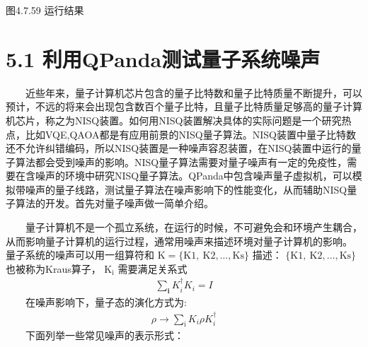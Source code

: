 \documentclass[a4paper,11pt,english]{sphinxmanual}
\begin{document}
\begin{center}图4.7.59 运行结果
\end{center}
\sphinxstepscope


\section{5.1 利用QPanda测试量子系统噪声}
\label{\detokenize{rst/5.1_u5229_u7528QPanda_u6d4b_u8bd5_u91cf_u5b50_u7cfb_u7edf_u566a_u58f0:qpanda}}\label{\detokenize{rst/5.1_u5229_u7528QPanda_u6d4b_u8bd5_u91cf_u5b50_u7cfb_u7edf_u566a_u58f0::doc}}
\sphinxAtStartPar
  近些年来，量子计算机芯片包含的量子比特数和量子比特质量不断提升，可以预计，不远的将来会出现包含数百个量子比特，且量子比特质量足够高的量子计算机芯片，称之为NISQ装置。如何用NISQ装置解决具体的实际问题是一个研究热点，比如VQE,QAOA都是有应用前景的NISQ量子算法。NISQ装置中量子比特数还不允许纠错编码，所以NISQ装置是一种噪声容忍装置，在NISQ装置中运行的量子算法都会受到噪声的影响。NISQ量子算法需要对量子噪声有一定的免疫性，需要在含噪声的环境中研究NISQ量子算法。QPanda中包含噪声量子虚拟机，可以模拟带噪声的量子线路，测试量子算法在噪声影响下的性能变化，从而辅助NISQ量子算法的开发。首先对量子噪声做一简单介绍。

\sphinxAtStartPar
{}

\sphinxAtStartPar
  量子计算机不是一个孤立系统，在运行的时候，不可避免会和环境产生耦合，从而影响量子计算机的运行过程，通常用噪声来描述环境对量子计算机的影响。 量子系统的噪声可以用一组算符和  \(\mathrm{K}=\{\mathrm{K}{1}, \mathrm{~K}{2}, \ldots, \mathrm{K}{\mathrm{s}}\}\) 描述： \(\{\mathrm{K}{1}, \mathrm{~K}{2}, \ldots, \mathrm{K}{\mathrm{s}}\}\) 也被称为Kraus算子，  \(\mathrm{K}_{\mathrm{i}}\) 需要满足关系式
\begin{equation*}
\begin{split}\sum_{\mathbf{i}} K_{i}^{\dagger} K_{i}=I\end{split}
\end{equation*}
\sphinxAtStartPar
  在噪声影响下，量子态的演化方式为:
\begin{equation*}
\begin{split}\rho \rightarrow \sum_{\mathrm{i}} K_{i} \rho K_{i}^{\dagger}\end{split}
\end{equation*}
\sphinxAtStartPar
  下面列举一些常见噪声的表示形式：
\end{document}
